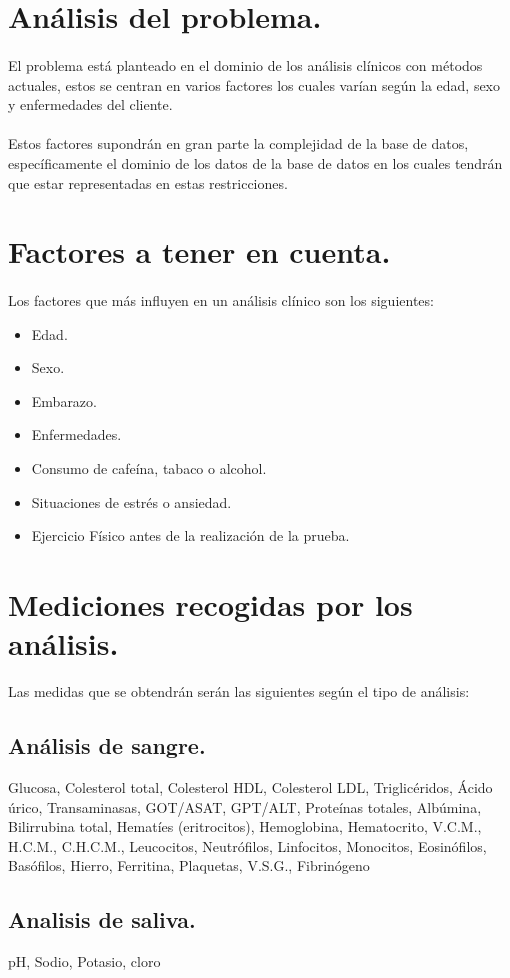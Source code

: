 \documentclass[a4paper,10pt]{article}
\begin{document}
\section{Análisis del problema.}
\paragraph{}
El problema está planteado en el dominio de los análisis clínicos con métodos actuales, estos se centran en varios factores los cuales varían según la edad, sexo y enfermedades del cliente.
\paragraph{}
Estos factores supondrán en gran parte la complejidad de la base de datos, específicamente el dominio de los datos de la base de datos en los cuales tendrán que estar representadas en estas restricciones.
\section{Factores a tener en cuenta.}
\paragraph{}
Los factores que más influyen en un análisis clínico son los siguientes:
\begin{itemize}
\item Edad.
\item Sexo.
\item Embarazo.
\item Enfermedades.
\item Consumo de cafeína, tabaco o alcohol.
\item Situaciones de estrés o ansiedad.
\item Ejercicio Físico antes de la realización de la prueba.
\end{itemize}

\section{Mediciones recogidas por los análisis.}
Las medidas que se obtendrán serán las siguientes según el tipo de análisis:
\subsection{Análisis de sangre.}
Glucosa, Colesterol total, Colesterol HDL, Colesterol LDL, Triglicéridos, Ácido úrico, Transaminasas, GOT/ASAT, GPT/ALT, Proteínas totales, Albúmina, Bilirrubina total, Hematíes (eritrocitos), Hemoglobina, Hematocrito, V.C.M., H.C.M., C.H.C.M., Leucocitos, Neutrófilos, Linfocitos, Monocitos, Eosinófilos, Basófilos, Hierro, Ferritina, Plaquetas, V.S.G., Fibrinógeno \subsection{Analisis de saliva.}
pH, Sodio, Potasio, cloro
\end{document}
